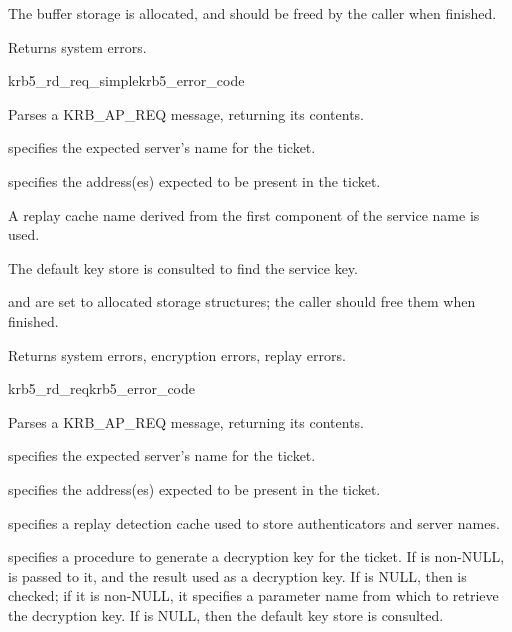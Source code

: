 The  buffer storage is allocated, and should be freed
by the caller when finished.

Returns system errors.


\begin{funcdecl}{krb5_rd_req_simple}{krb5_error_code}{\funcin}
\funcout
{}
\end{funcdecl}

Parses a KRB_AP_REQ message, returning its contents.

 specifies the expected server's name for the ticket.

 specifies the address(es) expected to be present
in the ticket.

A replay cache name derived from the first component of the service name
is used.

The default key store is consulted to find the service key.

 and
 are set to allocated storage
structures; the caller should free them when finished.

Returns system errors, encryption errors, replay errors.


\begin{funcdecl}{krb5_rd_req}{krb5_error_code}{\funcin}
\funcendfuncarg
{}
\funcinout
{}
\funcout
{}
\end{funcdecl}


Parses a KRB_AP_REQ message, returning its contents.

 specifies the expected server's name for the ticket.

 specifies the address(es) expected to be present
in the ticket.

 specifies a replay detection cache used to store
authenticators and server names.

 specifies a procedure to generate a decryption key for the
ticket.  If  is non-NULL,  is
passed to it, and the result used as a decryption key. If
 is NULL, then  is checked; if
it is non-NULL, it specifies a parameter name from which to retrieve the
decryption key.  If  is NULL, then the default key
store is consulted.

